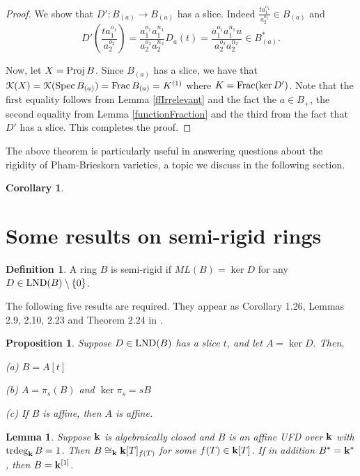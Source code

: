 \documentclass[12pt]{amsart}
\theoremstyle{plain}
\newtheorem{proposition}[subsection]{Proposition}
\newtheorem{lemma}[subsection]{Lemma}
\newtheorem{corollary}[subsection]{Corollary}
\theoremstyle{definition}
\newtheorem{definition}[subsection]{Definition}
\newcommand{\Spec}{		\operatorname{{\rm Spec}}}
\newcommand{\Proj}{		\operatorname{{\rm Proj}}}
\newcommand{\trdeg}{	\operatorname{{\rm trdeg}}}
\newcommand{\Frac}{		\operatorname{{\rm Frac}}}
\newcommand{\bk}{{\ensuremath{\rm \bf k}}}
\newcommand{\Keul}{\EuScript{K}}
\newcommand{\lnd}{\operatorname{{\rm LND}}}
\newcommand{\isom}{\cong}
\begin{document}
\begin{proof}
	We show that $D': B_{(a)} \to B_{(a)}$ has a slice. Indeed $\frac{ta_1^{o_1}}{a_2^{o_2}} \in B_{(a)}$ and $$D'(\frac{ta_1^{o_1}}{a_2^{o_2}}) = \frac{a_1^{o_1}a_1^{n_1}}{a_2^{o_2}a_2^{n_2}}D_a(t) = \frac{a_1^{o_1}a_1^{n_1}u}{a_2^{o_2}a_2^{n_2}} \in B_{(a)}^*.$$ 
	
	Now, let $X = \Proj B$. Since $B_{(a)}$ has a slice, we have that $\Keul(X) = \Keul(\Spec B_{(a)}) = \Frac B_{(a)}= K^{(1)}$ where $K = \Frac(\ker D')$. Note that the first equality follows from Lemma \ref{ffIrrelevant} and the fact the $a \in B_+$, the second equality from Lemma \ref{functionFraction} and the third from the fact that $D'$ has a slice. This completes the proof.     
\end{proof}

The above theorem is particularly useful in answering questions about the rigidity of Pham-Brieskorn varieties, a topic we discuss in the following section. 

\begin{corollary}
	
\end{corollary}

\section{Some results on semi-rigid rings}

\begin{definition}
	A ring $B$ is semi-rigid if $ML(B) = \ker D$ for any $D \in \lnd(B) \setminus\{0\}$. 
\end{definition}

The following five results are required. They appear as Corollary 1.26, Lemmas 2.9, 2.10, 2.23 and Theorem 2.24 in \cite{freudenburg2017algebraic}.

\begin{proposition}\label{sliceTheorem}
	Suppose $D \in \lnd(B)$ has a slice $t$, and let $A = \ker D$. Then,
	
	(a) $B = A[t]$
	
	(b) $A = \pi_s(B)$ and $\ker \pi_s = sB$
	
	(c) If $B$ is affine, then $A$ is affine. 
	
\end{proposition}

\begin{lemma} \label{FV2-2.9}
	Suppose $\bk$ is algebraically closed and $B$ is an affine UFD over $\bk$ with $\trdeg_\bk B = 1$. Then $B \isom_\bk \bk[T]_{f(T)}$ for some $f(T) \in \bk[T]$. If in addition $B^* = \bk^*$, then $B = \bk^{[1]}$. 
\end{lemma}
\end{document}
